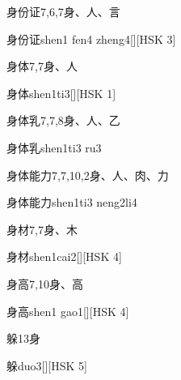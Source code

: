 \begin{Entry}{身份证}{7,6,7}{⾝、⼈、⾔}
  \begin{Phonetics}{身份证}{shen1 fen4 zheng4}[][HSK 3]
  \end{Phonetics}
\end{Entry}

\begin{Entry}{身体}{7,7}{⾝、⼈}
  \begin{Phonetics}{身体}{shen1ti3}[][HSK 1]
  \end{Phonetics}
\end{Entry}

\begin{Entry}{身体乳}{7,7,8}{⾝、⼈、⼄}
  \begin{Phonetics}{身体乳}{shen1ti3 ru3}
  \end{Phonetics}
\end{Entry}

\begin{Entry}{身体能力}{7,7,10,2}{⾝、⼈、⾁、⼒}
  \begin{Phonetics}{身体能力}{shen1ti3 neng2li4}
  \end{Phonetics}
\end{Entry}

\begin{Entry}{身材}{7,7}{⾝、⽊}
  \begin{Phonetics}{身材}{shen1cai2}[][HSK 4]
  \end{Phonetics}
\end{Entry}

\begin{Entry}{身高}{7,10}{⾝、⾼}
  \begin{Phonetics}{身高}{shen1 gao1}[][HSK 4]
  \end{Phonetics}
\end{Entry}

\begin{Entry}{躲}{13}{⾝}
  \begin{Phonetics}{躲}{duo3}[][HSK 5]
  \end{Phonetics}
\end{Entry}

